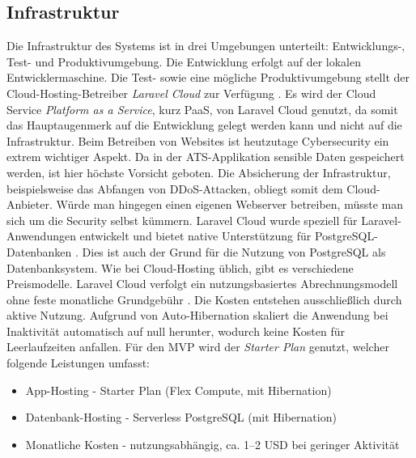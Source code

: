 \subsection{Infrastruktur}
Die Infrastruktur des Systems ist in drei Umgebungen unterteilt: Entwicklungs-, Test- und Produktivumgebung. 
Die Entwicklung erfolgt auf der lokalen Entwicklermaschine. 
Die Test- sowie eine mögliche Produktivumgebung stellt der Cloud-Hosting-Betreiber \textit{Laravel Cloud} zur Verfügung \parencite{laravelCloud}.
Es wird der Cloud Service \textit{Platform as a Service}, kurz PaaS, von Laravel Cloud genutzt, da somit das Hauptaugenmerk auf die Entwicklung gelegt werden kann und nicht auf die Infrastruktur.
Beim Betreiben von Websites ist heutzutage Cybersecurity ein extrem wichtiger Aspekt. 
Da in der ATS-Applikation sensible Daten gespeichert werden, ist hier höchste Vorsicht geboten. 
Die Absicherung der Infrastruktur, beispielsweise das Abfangen von DDoS-Attacken, obliegt somit dem Cloud-Anbieter. 
Würde man hingegen einen eigenen Webserver betreiben, müsste man sich um die Security selbst kümmern.
Laravel Cloud wurde speziell für Laravel-Anwendungen entwickelt und bietet native Unterstützung für PostgreSQL-Datenbanken \parencite{laravelCloudDocs}. 
Dies ist auch der Grund für die Nutzung von PostgreSQL als Datenbanksystem.
Wie bei Cloud-Hosting üblich, gibt es verschiedene Preismodelle. 
Laravel Cloud verfolgt ein nutzungsbasiertes Abrechnungsmodell ohne feste monatliche Grundgebühr \parencite{laravelCloudPricing}. 
Die Kosten entstehen ausschließlich durch aktive Nutzung. 
Aufgrund von Auto-Hibernation skaliert die Anwendung bei Inaktivität automatisch auf null herunter, wodurch keine Kosten für Leerlaufzeiten anfallen. 
Für den MVP wird der \textit{Starter Plan} genutzt, welcher folgende Leistungen umfasst:
\begin{itemize}
\item App-Hosting - Starter Plan (Flex Compute, mit Hibernation) \parencite{laravelCloudPricing}
\item Datenbank-Hosting - Serverless PostgreSQL (mit Hibernation) \parencite{laravelCloudPricing}
\item Monatliche Kosten - nutzungsabhängig, ca. 1--2 USD bei geringer Aktivität
\end{itemize}

